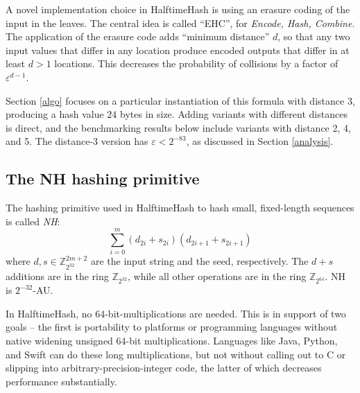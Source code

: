 \documentclass[runningheads]{llncs}
\newcommand{\ints}{\mathbb{Z}}
\begin{document}
A novel implementation choice in HalftimeHash is using an erasure coding of the input in the leaves.
The central idea is called ``EHC'', for {\em Encode, Hash, Combine}. \cite{ehc-nandi}
The application of the erasure code adds ``minimum distance'' $d$, so that any two input values that differ in any location produce encoded outputs that differ in at least $d > 1$ locations.
This decreases the probability of collisions by a factor of $\varepsilon^{d-1}$.


Section \ref{algo} focuses on a particular instantiation of this formula with distance $3$, producing a hash value $24$ bytes in size.
Adding variants with different distances is direct, and the benchmarking results below include variants with distance 2, 4, and 5.
The distance-3 version has $\varepsilon < 2^{-83}$, as discussed in Section \ref{analysis}.

\subsection{The NH hashing primitive}

The hashing primitive used in HalftimeHash to hash small, fixed-length sequences is called {\em NH}: \cite{umac}
\[
\sum_{i=0}^m (d_{2i} + s_{2i})(d_{2i+1} + s_{2i+1})
\]
where $d, s \in \ints_{2^{32}}^{2m+2}$ are the input string and the seed, respectively.
The $d + s$ additions are in the ring $\ints_{2^{32}}$, while all other operations are in the ring $\ints_{2^{64}}$.
NH is $2^{-32}$-AU.

In HalftimeHash, no 64-bit-mul\-ti\-pli\-ca\-tions are needed.
This is in support of two goals --
the first is portability to platforms or programming languages without native widening unsigned 64-bit multiplications.
Languages like Java, Python, and Swift can do these long multiplications, but not without calling out to C or slipping into arbitrary-precision-integer code, the latter of which decreases performance substantially.
\end{document}
